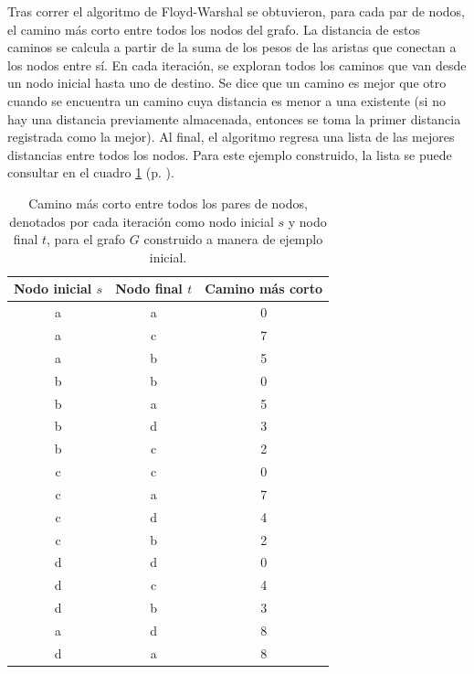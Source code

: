 \documentclass{article}
\begin{document}
  Tras correr el algoritmo de Floyd-Warshal se obtuvieron, para cada par de nodos, el camino más corto entre todos los nodos del grafo. La distancia de estos caminos se calcula a partir de la suma de los pesos de las aristas que conectan a los nodos entre sí. En cada iteración, se exploran todos los caminos que van desde un nodo inicial hasta uno de destino. Se dice que un camino es mejor que otro cuando se encuentra un camino cuya distancia es menor a una existente (si no hay una distancia previamente almacenada, entonces se toma la primer distancia registrada como la mejor). Al final, el algoritmo regresa una lista de las mejores distancias entre todos los nodos. Para este ejemplo construido, la lista se puede consultar en el cuadro \ref{cuadro:floyd-ejemplo} (p. \pageref{cuadro:floyd-ejemplo}).

  \begin{table}[]
  \centering
  \caption{Camino más corto entre todos los pares de nodos, denotados por cada iteración como nodo inicial $s$ y nodo final $t$, para el grafo $G$ construido a manera de ejemplo inicial.}
  \label{cuadro:floyd-ejemplo}
  \begin{tabular}{@{}ccc@{}}
  \toprule
  \textbf{Nodo inicial $s$} & \textbf{Nodo final $t$} & \textbf{Camino más corto} \\ \midrule
  a & a & 0 \\ \midrule
  a & c & 7 \\ \midrule
  a & b & 5 \\ \midrule
  b & b & 0 \\ \midrule
  b & a & 5 \\ \midrule
  b & d & 3 \\ \midrule
  b & c & 2 \\ \midrule
  c & c & 0 \\ \midrule
  c & a & 7 \\ \midrule
  c & d & 4 \\ \midrule
  c & b & 2 \\ \midrule
  d & d & 0 \\ \midrule
  d & c & 4 \\ \midrule
  d & b & 3 \\ \midrule
  a & d & 8 \\ \midrule
  d & a & 8 \\ \bottomrule
  \end{tabular}
  \end{table}
\end{document}
